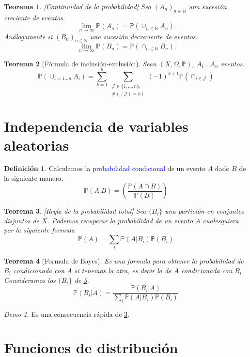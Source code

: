 \documentclass[11pt]{article}
\theoremstyle{plain} %
\newtheorem{teorema}{Teorema}
\theoremstyle{definition}
\newtheorem*{definicion}{Definici\'{o}n} %
\theoremstyle{remark}
\newtheorem*{demo}{Demo}
\def\Om{\Omega}
\def\N{\mathbb{N}}
\def\P{\mathbb{P}}
\def\blue{\textcolor{blue}}
\begin{document}
\begin{teorema}
	\label{teo:contproba}
	[Continuidad de la probabilidad]
	Sea $(A_n)_{n \in \N}$ una sucesi\'on creciente de eventos.
	\[ \ \lim_{n \to \infty} \P(A_n) = \P(\cup_{n \in \N} A_n). \]
	An\'alogamente si $(B_n)_{n \in \N}$ una sucesi\'on decreciente de eventos.
	\[ \ \lim_{n \to \infty} \P(B_n) = \P(\cap_{n \in \N} B_n). \]
\end{teorema}

\begin{teorema}
	[F\'ormula de inclusi\'on-exclusi\'on]
	Sean $\left( X,\Om,\mathbb P\right) $, $A_1 \dots A_n$ eventos.
	\begin{equation*}
		\P \left( \cup_{i=1 \dots n} A_{i}\right)  = \sum_{k=1}^{n} \sum_{\substack{\mathcal{J}\in \{1,\dots,n\},\\\#(\mathcal{(J)} = k)}}	\left(-1 \right)^{k+1} \P\left( \cap_{i \in \mathcal J} \right)  		
	\end{equation*}
\end{teorema}
\bigskip
\section{Independencia de variables aleatorias}

\begin{definicion}
	Calculamos la \blue{probabilidad condicional} de un evento $A$ dado $B$ de la siguiente manera.
	\[\P(A|B) = \left(\dfrac{\P(A\cap B)}{\P(B)} \right) \]
\end{definicion}

\begin{teorema}
	\label{teo:total}
	[Regla de la probabilidad total]
	Sea $\{B_i\}$ una partici\'on  en conjuntos disjuntos de $X$. Podemos recuperar la probabilidad de un evento $A$ cualesquiera por la siguiente formula
	\[ \P(A) = \sum_{i}\P(A|B_i)\P(B_i)\]
\end{teorema}

\begin{teorema}
	[Formula de Bayes]
	Es una formula para obtener la probabilidad de $B_i$ condicionada con $A$ si tenemos la otra, es decir la de $A$ condicionada con $B_i$. Consideramos los $\{B_i\}$ de \ref{teo:total}.
	\[\P(B_i|A) = \dfrac{\P(B_i|A)}{\sum_{i}\P(A|B_i)\P(B_i)}\]
\end{teorema}

\begin{demo}
	Es una consecuencia r\'apida de \ref{teo:total}.
\end{demo}
\bigskip
\section{Funciones de distribuci\'on}
\end{document}
